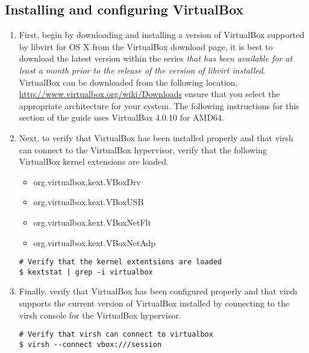 \subsection{Installing and configuring VirtualBox}
\label{sec:osxvbox}
\begin{enumerate}
\item	First, begin by downloading and installing a version of VirtualBox supported by libvirt for OS X from the VirtualBox download 
		page, it is best to download the latest version within the series \emph{that has been available for at least a month prior to the release
		of the version of libvirt installed}. VirtualBox can be downloaded from the following location,  
		\url{http://www.virtualbox.org/wiki/Downloads} ensure that you select the appropriate architecture for your system. The following
		 instructions for this section of the guide uses VirtualBox 4.0.10 for AMD64.
		
\item	Next, to verify that VirtualBox has been installed properly and that virsh can connect to the VirtualBox hypervisor, 
		verify that the following VirtualBox kernel extensions are loaded.
		
\begin{itemize}
\item	org.virtualbox.kext.VBoxDrv
\item	org.virtualbox.kext.VBoxUSB
\item	org.virtualbox.kext.VBoxNetFlt
\item	org.virtualbox.kext.VBoxNetAdp
\end{itemize}

\lstset{language=bash,caption=Verify that VirtualBox Kernel Exentsions are Loaded}
\begin{lstlisting}
# Verify that the kernel extentsions are loaded
$ kextstat | grep -i virtualbox
\end{lstlisting}

\item        Finally, verify that VirtualBox has been configured properly and that virsh supports the current version of VirtualBox installed
                by connecting to the virsh console for the VirtualBox hypervisor.

\lstset{language=bash,caption=Verify VirtualBox Works with Virsh}
\begin{lstlisting}
# Verify that virsh can connect to virtualbox
$ virsh --connect vbox:///session
\end{lstlisting}
\end{enumerate}




